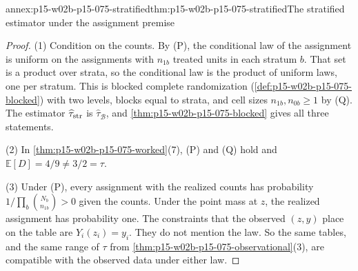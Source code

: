\begin{annexitem}{annex:p15-w02b-p15-075-stratified}{thm:p15-w02b-p15-075-stratified}{The stratified estimator under the assignment premise}
\begin{proof}
(1) Condition on the counts. By (P), the conditional law of the assignment is
uniform on the assignments with \(n_{1b}\) treated units in each stratum \(b\).
That set is a product over strata, so the conditional law is the product of
uniform laws, one per stratum. This is blocked complete randomization
(\cref{def:p15-w02b-p15-075-blocked}) with two levels, blocks equal to strata,
and cell sizes \(n_{1b},n_{0b}\geq1\) by (Q). The estimator
\(\widehat\tau_{\rm str}\) is \(\widehat\tau_{\mathcal B}\), and
\cref{thm:p15-w02b-p15-075-blocked} gives all three statements.

(2) In \cref{thm:p15-w02b-p15-075-worked}(7), (P) and (Q) hold and
\(\mathbb E[D]=4/9\neq3/2=\tau\).

(3) Under (P), every assignment with the realized counts has probability
\(1/\prod_b\binom{N_b}{n_{1b}}>0\) given the counts. Under the point mass at
\(z\), the realized assignment has probability one. The constraints that the
observed \((z,y)\) place on the table are \(Y_i(z_i)=y_i\). They do not mention
the law. So the same tables, and the same range of \(\tau\) from
\cref{thm:p15-w02b-p15-075-observational}(3), are compatible with the observed data
under either law.
\end{proof}
\end{annexitem}

